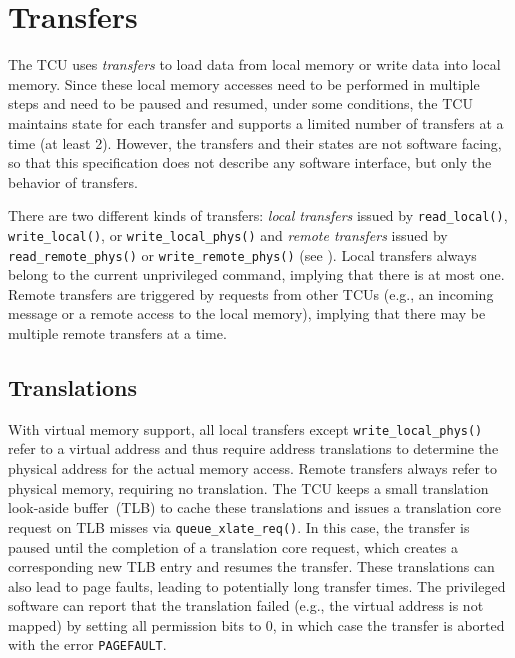 \chapter{Transfers}

The TCU uses \emph{transfers} to load data from local memory or write data into local memory. Since
these local memory accesses need to be performed in multiple steps and need to be paused and
resumed\colorbox{vm}{, under some conditions,} the TCU maintains state for each transfer and
supports a limited number of transfers at a time (at least 2). However, the transfers and their
states are not software facing, so that this specification does not describe any software interface,
but only the behavior of transfers.

There are two different kinds of transfers: \emph{local transfers} issued by \texttt{read\_local()},
\texttt{write\_local()}, or \texttt{write\_local\_phys()} and \emph{remote transfers} issued by
\texttt{read\_remote\_phys()} or \texttt{write\_remote\_phys()} (see ).
Local transfers always belong to the current unprivileged command, implying that there is at most
one. Remote transfers are triggered by requests from other TCUs (e.g., an incoming message or a
remote access to the local memory), implying that there may be multiple remote transfers at a time.

\section{Translations}
\label{sec:xlates}

With virtual memory support, all local transfers except \texttt{write\_local\_phys()} refer to a
virtual address and thus require address translations to determine the physical address for the
actual memory access. Remote transfers always refer to physical memory, requiring no translation.
The TCU keeps a small translation look-aside buffer~(TLB) to cache these translations and issues a
translation core request on TLB misses via \texttt{queue\_xlate\_req()}. In this case, the transfer
is paused until the completion of a translation core request, which creates a corresponding new TLB
entry and resumes the transfer. These translations can also lead to page faults, leading to
potentially long transfer times. The privileged software can report that the translation failed
(e.g., the virtual address is not mapped) by setting all permission bits to 0, in which case the
transfer is aborted with the error \texttt{PAGEFAULT}.


